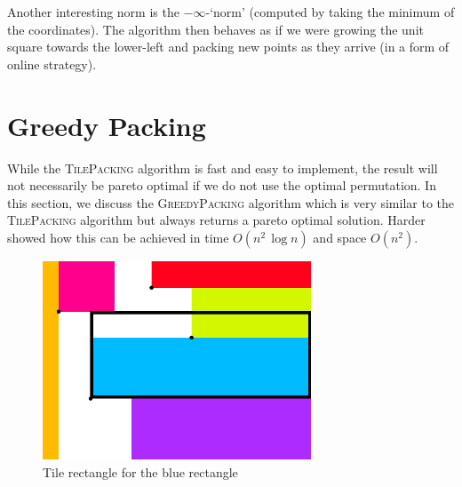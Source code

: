 \documentclass[11pt, a4paper, twocolumn]{article}
\begin{document}
Another interesting norm is the $-\infty$-`norm'
(computed by taking the minimum of the coordinates). The algorithm then
behaves as if we were growing the unit square towards the lower-left
and packing new points as they arrive (in a form of online strategy).




\section{Greedy Packing}
\label{greedy}

While the \textsc{TilePacking} algorithm is fast and easy to implement,
the result will not necessarily be pareto optimal if we do not use the optimal permutation.
In this section, we discuss the \textsc{GreedyPacking} algorithm which is very similar
to the \textsc{TilePacking} algorithm but always returns a pareto optimal solution.
Harder \cite{harder2019anchoredrectanglecover} showed how this can be achieved in
time $O(n^2\, \log n)$ and space $O(n^2)$.

\begin{figure}
  \begin{center}
  \includegraphics[width=8cm]{tilerect.png}
  \end{center}
\caption{Tile rectangle for the blue rectangle}
\label{tilerect}
\end{figure}
\end{document}
